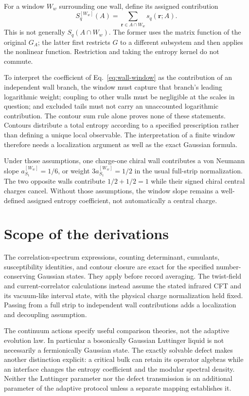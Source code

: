 \documentclass[aps,prb,onecolumn,nofootinbib,superscriptaddress]{revtex4-2}
\begin{document}
For a window $W_w$ surrounding one wall, define its assigned contribution
\begin{equation}
 S_q^{[W_w]}(A)=\sum_{\boldsymbol r\in A\cap W_w}s_q(\boldsymbol r;A).
 \label{eq:wall-window}
\end{equation}
This is not generally $S_q(A\cap W_w)$. The former uses the matrix
function of the original $G_A$; the latter first restricts $G$ to a different
subsystem and then applies the nonlinear function. Restriction and taking
the entropy kernel do not commute.

To interpret the coefficient of Eq.~\eqref{eq:wall-window} as the
contribution of an independent wall branch, the window must capture that
branch's leading logarithmic weight; coupling to other walls must be
negligible at the scales in question; and excluded tails must not carry an
unaccounted logarithmic contribution. The contour sum rule alone proves
none of these statements. Contours distribute a total entropy according
to a specified prescription rather than defining a unique local observable.
The interpretation of a finite window therefore needs a localization
argument as well as the exact Gaussian formula.

Under those assumptions, one charge-one chiral wall contributes a von
Neumann slope $a_{S_1}^{[W_w]}=1/6$, or weight
$3a_{S_1}^{[W_w]}=1/2$ in the usual full-strip
normalization. The two opposite walls contribute $1/2+1/2=1$ while their
signed chiral central charges cancel. Without those assumptions, the
window slope remains a well-defined assigned entropy coefficient, not
automatically a central charge.

\section{Scope of the derivations}
The correlation-spectrum expressions, counting determinant, cumulants,
susceptibility identities, and contour closure are exact for the specified
number-conserving Gaussian states. They apply before record averaging.
The twist-field and current-correlator calculations instead assume the
stated infrared CFT and its vacuum-like interval state, with the physical
charge normalization held fixed. Passing from a full strip to independent
wall contributions adds a localization and decoupling assumption.

The continuum actions specify useful comparison theories, not the
adaptive evolution law. In particular a bosonically Gaussian Luttinger
liquid is not necessarily a fermionically Gaussian state. The exactly
solvable defect makes another distinction explicit: a critical bulk can
retain its operator algebras while an interface changes the entropy
coefficient and the modular spectral density. Neither the Luttinger
parameter nor the defect transmission is an additional parameter of the
adaptive protocol unless a separate mapping establishes it.
\end{document}
